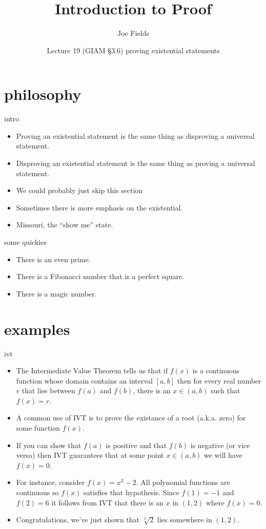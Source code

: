 \documentclass[landscape]{beamer}
\author{Joe Fields}
\title{Introduction to Proof}
\date{Lecture 19 (GIAM \S 3.6) \newline proving existential statements}
\institute[SCSU]{ {\tt fieldsj1@southernct.edu} }
\begin{document}
\begin{frame}[plain]
  \titlepage
\end{frame}

\section{philosophy}

\begin{frame}{intro}
\begin{itemize}
\item Proving an existential statement is the same thing as disproving a universal statement. \pause
\item Disproving an existential statement is the same thing as proving a universal statement. \pause
\item We could probably just skip this section\textellipsis \pause
\item Sometimes there is more emphasis on the existential. \pause
\item Missouri, the ``show me'' state.
\end{itemize}
\end{frame}

\begin{frame}{some quickies}
\begin{itemize}
\item There is an even prime. \pause
\item There is a Fibonacci number that is a perfect square.\pause
\item There is a magic number.
\end{itemize}
\end{frame}

\section{examples}

\begin{frame}{ivt}
\begin{itemize}
\item The Intermediate Value Theorem tells us that if $f(x)$ is a continuous function whose domain contains an interval $[a,b]$ then for every real number $r$ that lies between $f(a)$ and $f(b)$, there is an $x \in (a,b)$ such that $f(x) = r$. \pause
\item A common use of IVT is to prove the existance of a root (a.k.a. zero) for some function $f(x)$. \pause
\item If you can show that $f(a)$ is positive and that $f(b)$ is negative (or vice versa) then IVT guarantees
that at some point $x \in (a,b)$ we will have $f(x) = 0$. \pause
\item For instance, consider $f(x) = x^3 - 2$. All polynomial functions are continuous so $f(x)$ satisfies that hypothesis.  Since $f(1) = -1$ and $f(2) = 6$ it follows from IVT that there is an $x$ in $(1,2)$ where $f(x)=0$. \pause
\item Congratulations, we've just shown that $\sqrt[3]{2}$ lies somewhere in $(1,2)$.
\end{itemize}
\end{frame}
\end{document}
